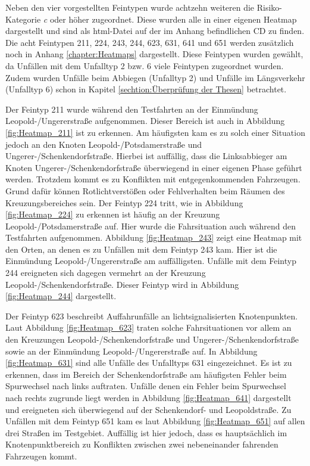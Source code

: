 Neben den vier vorgestellten Feintypen wurde achtzehn weiteren die Risiko-Kategorie \textit{c} oder höher zugeordnet. Diese wurden alle in einer eigenen Heatmap dargestellt und sind als html-Datei auf der im Anhang befindlichen CD zu finden. Die acht Feintypen 211, 224, 243, 244, 623, 631, 641 und 651 werden zusätzlich noch in Anhang \ref{chapter:Heatmaps} dargestellt. Diese Feintypen wurden gewählt, da Unfällen mit dem Unfalltyp 2 bzw. 6 viele Feintypen zugeordnet wurden. Zudem wurden Unfälle beim Abbiegen (Unfalltyp 2) und Unfälle im Längsverkehr (Unfalltyp 6) schon in Kapitel \ref{sechtion:Überprüfung der Thesen} betrachtet.

Der Feintyp 211 wurde während den Testfahrten an der Einmündung Leopold-/Ungererstraße aufgenommen. Dieser Bereich ist auch in Abbildung \ref{fig:Heatmap_211} ist zu erkennen. Am häufigsten kam es zu solch einer Situation jedoch an den Knoten Leopold-/Potsdamerstraße und Ungerer-/Schenkendorfstraße. Hierbei ist auffällig, dass die Linksabbieger am Knoten Ungerer-/Schenkendorfstraße überwiegend in einer eigenen Phase geführt werden. Trotzdem kommt es zu Konflikten mit entgegenkommenden Fahrzeugen. Grund dafür können Rotlichtverstößen oder Fehlverhalten beim Räumen des Kreuzungsbereiches sein. Der Feintyp 224 tritt, wie in Abbildung \ref{fig:Heatmap_224} zu erkennen ist häufig an der Kreuzung Leopold-/Potsdamerstraße auf. Hier wurde die Fahrsituation auch während den Testfahrten aufgenommen. Abbildung \ref{fig:Heatmap_243} zeigt eine Heatmap mit den Orten, an denen es zu Unfällen mit dem Feintyp 243 kam. Hier ist die Einmündung Leopold-/Ungererstraße am auffälligsten. Unfälle mit dem Feintyp 244 ereigneten sich dagegen vermehrt an der Kreuzung Leopold-/Schenkendorfstraße. Dieser Feintyp wird in Abbildung \ref{fig:Heatmap_244} dargestellt.

Der Feintyp 623 beschreibt Auffahrunfälle an lichtsignalisierten Knotenpunkten. Laut Abbildung \ref{fig:Heatmap_623} traten solche Fahrsituationen vor allem an den Kreuzungen Leopold-/Schenkendorfstraße und Ungerer-/Schenkendorfstraße sowie an der Einmündung Leopold-/Ungererstraße auf. In Abbildung \ref{fig:Heatmap_631} sind alle Unfälle des Unfalltyps 631 eingezeichnet. Es ist zu erkennen, dass im Bereich der Schenkendorfstraße am häufigsten Fehler beim Spurwechsel nach links auftraten. Unfälle denen ein Fehler beim Spurwechsel nach rechts zugrunde liegt werden in Abbildung \ref{fig:Heatmap_641} dargestellt und ereigneten sich überwiegend auf der Schenkendorf- und Leopoldstraße. Zu Unfällen mit dem Feintyp 651 kam es laut Abbildung \ref{fig:Heatmap_651} auf allen drei Straßen im Testgebiet. Auffällig ist hier jedoch, dass es hauptsächlich im Knotenpunktbereich zu Konflikten zwischen zwei nebeneinander fahrenden Fahrzeugen kommt.

